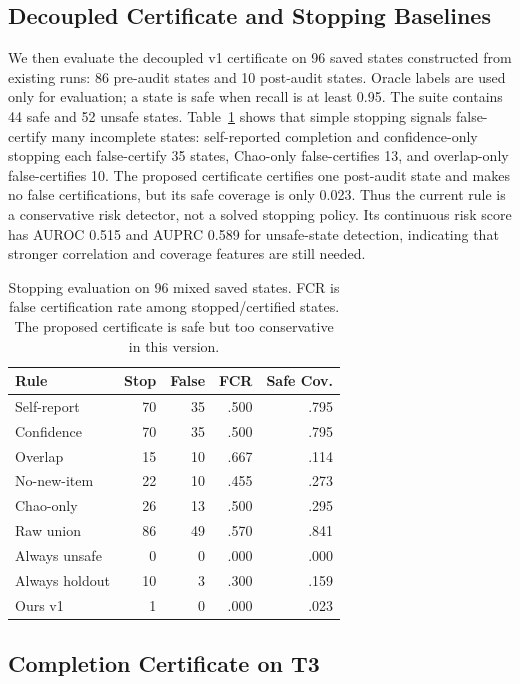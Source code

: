 \documentclass[letterpaper]{article}
\begin{document}
\subsection{Decoupled Certificate and Stopping Baselines}

We then evaluate the decoupled v1 certificate on 96 saved states constructed
from existing runs: 86 pre-audit states and 10 post-audit states. Oracle labels
are used only for evaluation; a state is safe when recall is at least 0.95. The
suite contains 44 safe and 52 unsafe states. Table~\ref{tab:v1-certificate}
shows that simple stopping signals false-certify many incomplete states:
self-reported completion and confidence-only stopping each false-certify 35
states, Chao-only false-certifies 13, and overlap-only false-certifies 10. The
proposed certificate certifies one post-audit state and makes no false
certifications, but its safe coverage is only 0.023. Thus the current rule is a
conservative risk detector, not a solved stopping policy. Its continuous risk
score has AUROC 0.515 and AUPRC 0.589 for unsafe-state detection, indicating
that stronger correlation and coverage features are still needed.

\begin{table}[t]
\centering
\small
\begin{tabular}{lrrrr}
\toprule
Rule & Stop & False & FCR & Safe Cov. \\
\midrule
Self-report & 70 & 35 & .500 & .795 \\
Confidence & 70 & 35 & .500 & .795 \\
Overlap & 15 & 10 & .667 & .114 \\
No-new-item & 22 & 10 & .455 & .273 \\
Chao-only & 26 & 13 & .500 & .295 \\
Raw union & 86 & 49 & .570 & .841 \\
Always unsafe & 0 & 0 & .000 & .000 \\
Always holdout & 10 & 3 & .300 & .159 \\
Ours v1 & 1 & 0 & .000 & .023 \\
\bottomrule
\end{tabular}
\caption{Stopping evaluation on 96 mixed saved states. FCR is false
certification rate among stopped/certified states. The proposed certificate is
safe but too conservative in this version.}
\label{tab:v1-certificate}
\end{table}

\subsection{Completion Certificate on T3}
\end{document}
